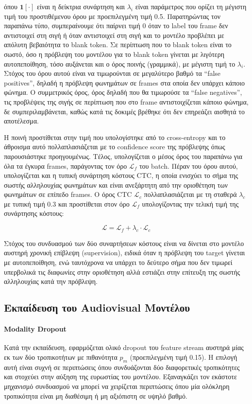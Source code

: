 όπου $\mathbf{1}[\cdot]$ είναι η δείκτρια συνάρτηση και $\lambda_i$ είναι παράμετρος που ορίζει τη μέγιστη τιμή του προστιθέμενου όρου με προεπιλεγμένη τιμή 0.5. Παρατηρώντας τον παραπάνω τύπο, συμπεραίνουμε ότι παίρνει τιμή 0 όταν το label του frame δεν αντιστοιχεί στη σιγή ή όταν αντιστοιχεί στη σιγή και το μοντέλο προβλέπει με απόλυτη βεβαιότητα το blank token. Σε περίπτωση που το blank token είναι το σωστό, όσο η πρόβλεψη του μοντέλου για το blank token γίνεται με λιγότερη αυτοπεποίθηση, τόσο αυξάνεται και ο όρος ποινής (γραμμικά), με μέγιστη τιμή το $\lambda_i$. Στόχος του όρου αυτού είναι να τιμωρούνται σε μεγαλύτερο βαθμό τα ``false positives'', δηλαδή η πρόβλεψη φωνημάτων σε frames στα οποία δεν υπάρχει κάποιο φώνημα. Ο συμμετρικός όρος, όρος δηλαδή που θα τιμωρούσε τα ``false negatives'', τις προβλέψεις της σιγής σε περίπτωση που στο frame αντιστοιχίζεται κάποιο φώνημα, δε συμπεριλαμβάνεται, καθώς κατά τις δοκιμές βρέθηκε ότι δεν επηρεάζει αισθητά το αποτέλεσμα.

Η ποινή προστίθεται στην τιμή που υπολογίστηκε από το cross-entropy και το άθροισμα αυτό πολλαπλασιάζεται με το confidence score της πρόβλεψης όπως παρουσιάστηκε προηγουμένως. Τέλος, υπολογίζεται ο μέσος όρος του παραπάνω για όλα τα έγκυρα frames, παράγοντας τον όρο $\mathcal{L}_f$ του batch. Πέραν του όρου αυτού, υπολογίζεται και η τυπική συνάρτηση κόστους CTC, η οποία ενισχύει το σήμα της σωστής αλληλουχίας φωνημάτων και είναι ανεξάρτητη από την οριοθέτηση των φωνημάτων σε επίπεδο frames. Ο όρος CTC $\mathcal{L}_c$ πολλαπλασιάζεται με τη σταθερά $\lambda_c$ με τυπική τιμή 0.3 και προστίθεται στον όρο $\mathcal{L}_f$ υπολογίζοντας την τελική τιμή της συνάρτησης κόστους:

\[
\mathcal{L} = \mathcal{L}_f + \lambda_c \cdot \mathcal{L}_c
\]

Στόχος του συνδυασμού των δύο συναρτήσεων κόστους είναι να δίνεται στο μοντέλο αυστηρή χρονική επίβλεψη (supervision), ειδικά όταν η πρόβλεψη του target γίνεται με αυτοπεποίθηση, ενώ ταυτόχρονα να υπάρχει το δεύτερο σήμα που δεν τιμωρεί υπερβολικά τις διαφωνίες στην οριοθέτηση αλλά εστιάζει στην επίτευξη της σωστής αλληλουχίας κατά την πρόβλεψη.

\subsection{Εκπαίδευση του Audiovisual Μοντέλου}
\label{AudiovisualTraining}

\paragraph{Modality Dropout}
\label{ModalityDropout}
Κατά την εκπαίδευση, εφαρμόζεται ολικό dropout του feature stream αυστηρά μίας εκ των δύο τροπικοτήτων με πιθανότητα $p_m$ (προεπιλεγμένη τιμή 0.15). Η επιλογή αυτή είναι συχνή σε περιπτώσεις όπου συνδυάζονται δύο διαφορετικές τροπικότητες και στοχεύει στην αύξηση της ευρωστίας του μοντέλου. Εξαναγκάζει τον εκάστοτε μηχανισμό συνδυασμού να μπορεί να χειρίζεται περιπτώσεις όπου μία ολόκληρη τροπικότητα είναι μη διαθέσιμη ή μη αξιόπιστη σε υψηλό βαθμό.

